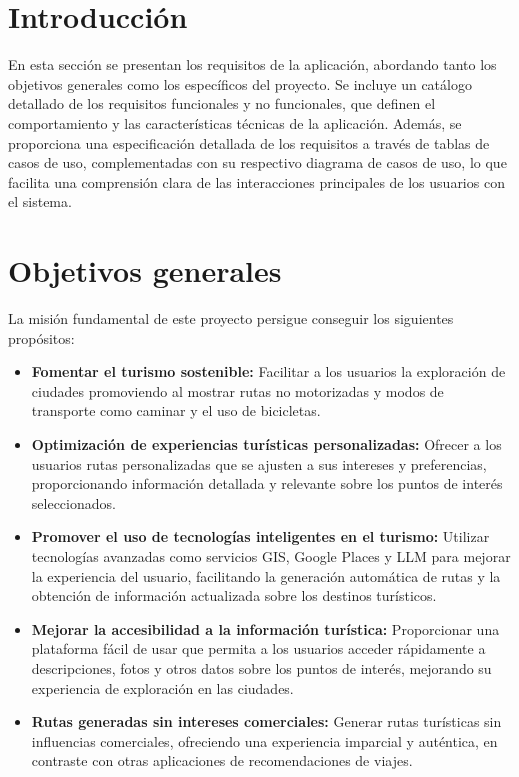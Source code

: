 
\section{Introducción}
En esta sección se presentan los requisitos de la aplicación, abordando tanto los objetivos generales como los específicos del proyecto. Se incluye un catálogo detallado de los requisitos funcionales y no funcionales, que definen el comportamiento y las características técnicas de la aplicación. Además, se proporciona una especificación detallada de los requisitos a través de tablas de casos de uso, complementadas con su respectivo diagrama de casos de uso, lo que facilita una comprensión clara de las interacciones principales de los usuarios con el sistema.


\section{Objetivos generales}
La misión fundamental de este proyecto persigue conseguir los siguientes propósitos:
\begin{itemize}
	\item \textbf{Fomentar el turismo sostenible:} Facilitar a los usuarios la exploración de ciudades promoviendo al mostrar rutas no motorizadas y modos de transporte como caminar y el uso de bicicletas.
	
	\item \textbf{Optimización de experiencias turísticas personalizadas:} Ofrecer a los usuarios rutas personalizadas que se ajusten a sus intereses y preferencias, proporcionando información detallada y relevante sobre los puntos de interés seleccionados.
	
	\item \textbf{Promover el uso de tecnologías inteligentes en el turismo:} Utilizar tecnologías avanzadas como servicios GIS, Google Places y LLM para mejorar la experiencia del usuario, facilitando la generación automática de rutas y la obtención de información actualizada sobre los destinos turísticos.
	
	\item \textbf{Mejorar la accesibilidad a la información turística:} Proporcionar una plataforma fácil de usar que permita a los usuarios acceder rápidamente a descripciones, fotos y otros datos sobre los puntos de interés, mejorando su experiencia de exploración en las ciudades.
	
	\item \textbf{Rutas generadas sin intereses comerciales:} Generar rutas turísticas sin influencias comerciales, ofreciendo una experiencia imparcial y auténtica, en contraste con otras aplicaciones de recomendaciones de viajes.
\end{itemize}

